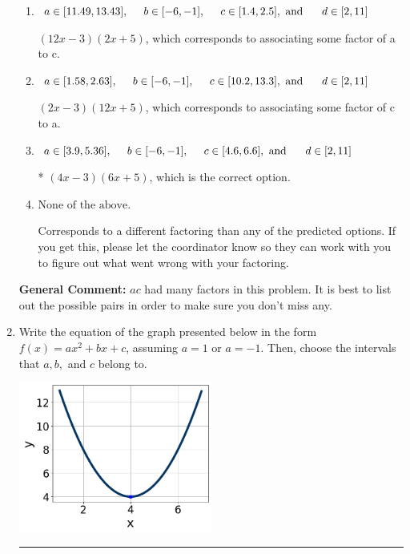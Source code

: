 \documentclass{extbook}[14pt]
\newcommand{\litem}[1]{\item #1

\rule{\textwidth}{0.4pt}}
\begin{document}
\begin{enumerate}
{\begin{enumerate}[label=\Alph*.]
 $(x -18)(x + 20)$, which corresponds to factoring $x^{2} +2 x -360$.
\item \( a \in [11.49, 13.43], \hspace*{5mm} b \in [-6, -1], \hspace*{5mm} c \in [1.4, 2.5], \text{ and } \hspace*{5mm} d \in [2, 11] \)

 $(12x -3)(2x + 5)$, which corresponds to associating some factor of a to c.
\item \( a \in [1.58, 2.63], \hspace*{5mm} b \in [-6, -1], \hspace*{5mm} c \in [10.2, 13.3], \text{ and } \hspace*{5mm} d \in [2, 11] \)

 $(2x -3)(12x + 5)$, which corresponds to associating some factor of c to a.
\item \( a \in [3.9, 5.36], \hspace*{5mm} b \in [-6, -1], \hspace*{5mm} c \in [4.6, 6.6], \text{ and } \hspace*{5mm} d \in [2, 11] \)

* $(4x -3)(6x + 5)$, which is the correct option.
\item \( \text{None of the above.} \)

 Corresponds to a different factoring than any of the predicted options. If you get this, please let the coordinator know so they can work with you to figure out what went wrong with your factoring.
\end{enumerate}

\textbf{General Comment:} $ac$ had many factors in this problem. It is best to list out the possible pairs in order to make sure you don't miss any.
}
\litem{
Write the equation of the graph presented below in the form $f(x)=ax^2+bx+c$, assuming  $a=1$ or $a=-1$. Then, choose the intervals that $a, b,$ and $c$ belong to.

\begin{center}
    \includegraphics[width=0.5\textwidth]{../Figures/quadraticGraphToEquationB.png}
\end{center}


}
\end{enumerate}
\end{document}

